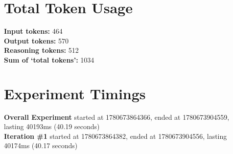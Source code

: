 \documentclass{article}
\begin{document}
\section*{Total Token Usage}
\textbf{Input tokens: }464
\\\textbf{Output tokens: }570
\\\textbf{Reasoning tokens: }512
\\\textbf{Sum of `total tokens': }1034
\section*{Experiment Timings}
\textbf{Overall Experiment} started at 1780673864366, ended at 1780673904559, lasting 40193ms (40.19 seconds)
\\\textbf{Iteration \#1} started at 1780673864382, ended at 1780673904556, lasting 40174ms (40.17 seconds)
\end{document}
